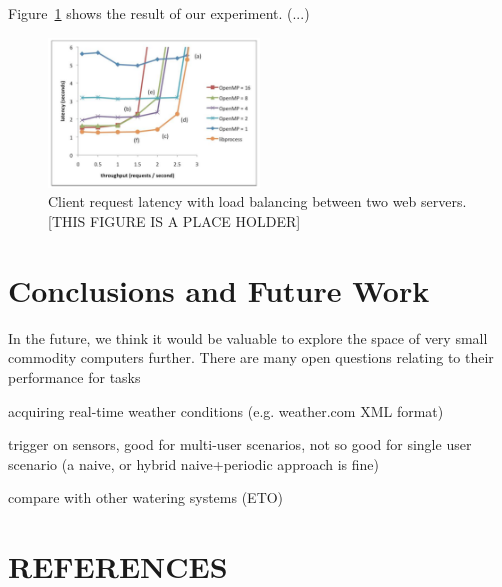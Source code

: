 \documentclass[a4paper]{acm_proc_article-sp}
\begin{document}
Figure~\ref{fig:parallel_result} shows the result of our experiment. (...)

\begin{figure}
  \centering
      \includegraphics[width=0.5\textwidth]{multiplePis.png}
  \caption{\label{fig:parallel_result}Client request latency with load balancing between two web servers. [THIS FIGURE IS A PLACE HOLDER]}
\end{figure}

\section{Conclusions and Future Work}

In the future, we think it would be valuable to explore the space of very small commodity computers further.  There are many open questions relating to their performance for tasks

acquiring real-time weather conditions (e.g. weather.com XML format)

trigger on sensors, good for multi-user scenarios, not so good for single user scenario (a naive, or hybrid naive+periodic approach is fine)

compare with other watering systems (ETO)

\section{REFERENCES}
\end{document}
